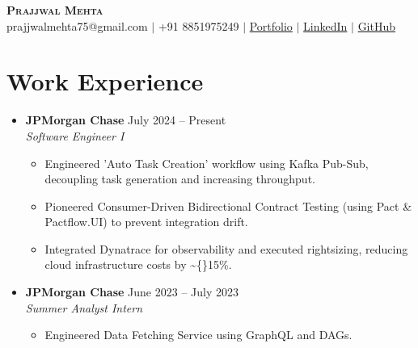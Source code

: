 \documentclass[a4paper,10pt]{article}
\newcommand{\resumeItem}[1]{\item\small{#1}}
\begin{document}
\begin{center}
    \textbf{\Huge \scshape Prajjwal Mehta} \\ \vspace{5pt}
    \small prajjwalmehta75@gmail.com $|$ 
    +91 8851975249 $|$ 
    \href{https://prajjwalmehta.github.io/my-portfolio/}{Portfolio}%
         $|$ \href{https://www.linkedin.com/in/prajjwalmehta}{LinkedIn}%
         $|$ \href{https://github.com/PRAJJWALmehta}{GitHub}%
\end{center}

\section{Work Experience}
\begin{itemize}[leftmargin=0.15in, label={}]
    
    \item
        \textbf{JPMorgan Chase} \hfill 
        July 2024 -- Present \\
        \textit{Software Engineer I}
        \begin{itemize}[leftmargin=0.2in]
            
                
                    \resumeItem{Engineered 'Auto Task Creation' workflow using Kafka Pub-Sub, decoupling task generation and increasing throughput.}
                
                    \resumeItem{Pioneered Consumer-Driven Bidirectional Contract Testing (using Pact \& Pactflow.UI) to prevent integration drift.}
                
                    \resumeItem{Integrated Dynatrace for observability and executed rightsizing, reducing cloud infrastructure costs by \textasciitilde\{\}15\%.}
                
            
        \end{itemize}
    
    \item
        \textbf{JPMorgan Chase} \hfill 
        June 2023 -- July 2023 \\
        \textit{Summer Analyst Intern}
        \begin{itemize}[leftmargin=0.2in]
            
                
                    \resumeItem{Engineered Data Fetching Service using GraphQL and DAGs.}
                

\end{itemize}
\end{itemize}
\end{document}
